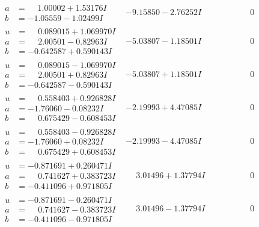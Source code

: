 \documentclass[1p]{elsarticle_modified}
\theoremstyle{definition}
\begin{document}
$$\begin{array}{c|c|c}
\begin{aligned}
a &= \phantom{-}1.00002 + 1.53176 I \\
b &= -1.05559 - 1.02499 I\end{aligned}
 & -9.15850 - 2.76252 I & \phantom{-0.000000 } 0 \\ \hline\begin{aligned}
u &= \phantom{-}0.089015 + 1.069970 I \\
a &= \phantom{-}2.00501 - 0.82963 I \\
b &= -0.642587 + 0.590143 I\end{aligned}
 & -5.03807 - 1.18501 I & \phantom{-0.000000 } 0 \\ \hline\begin{aligned}
u &= \phantom{-}0.089015 - 1.069970 I \\
a &= \phantom{-}2.00501 + 0.82963 I \\
b &= -0.642587 - 0.590143 I\end{aligned}
 & -5.03807 + 1.18501 I & \phantom{-0.000000 } 0 \\ \hline\begin{aligned}
u &= \phantom{-}0.558403 + 0.926828 I \\
a &= -1.76060 - 0.08232 I \\
b &= \phantom{-}0.675429 - 0.608453 I\end{aligned}
 & -2.19993 + 4.47085 I & \phantom{-0.000000 } 0 \\ \hline\begin{aligned}
u &= \phantom{-}0.558403 - 0.926828 I \\
a &= -1.76060 + 0.08232 I \\
b &= \phantom{-}0.675429 + 0.608453 I\end{aligned}
 & -2.19993 - 4.47085 I & \phantom{-0.000000 } 0 \\ \hline\begin{aligned}
u &= -0.871691 + 0.260471 I \\
a &= \phantom{-}0.741627 + 0.383723 I \\
b &= -0.411096 + 0.971805 I\end{aligned}
 & \phantom{-}3.01496 + 1.37794 I & \phantom{-0.000000 } 0 \\ \hline\begin{aligned}
u &= -0.871691 - 0.260471 I \\
a &= \phantom{-}0.741627 - 0.383723 I \\
b &= -0.411096 - 0.971805 I\end{aligned}
 & \phantom{-}3.01496 - 1.37794 I & \phantom{-0.000000 } 0 \\ \hline\begin{aligned}

\end{aligned}
\end{array}$$
\end{document}
